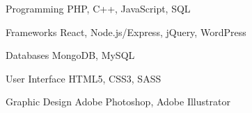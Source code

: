 

\begin{cvskills}

  \cvskill
    {Programming} %
    {PHP, C++, JavaScript, SQL} %

  \cvskill
    {Frameworks} %
    {React, Node.js/Express, jQuery, WordPress} %

  \cvskill
    {Databases} %
    {MongoDB, MySQL} %

  \cvskill
    {User Interface} %
    {HTML5, CSS3, SASS} %

  \cvskill
    {Graphic Design} %
    {Adobe Photoshop, Adobe Illustrator} %

\end{cvskills}
